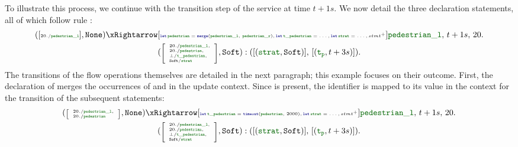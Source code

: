 To illustrate this process, we continue with the transition step of the  service at time
$t + 1s$. We now detail the three declaration statements, all of which follow rule
:
\begin{multline*}
    ([\mathtiny{20./\idf{pedestrian\_l}}], \No)
    \xRightarrow[\mathtiny{
            \decl{\idf{pedestrian}}{\mergeop{\idf{pedestrian\_l}}{\idf{pedestrian\_r}}},
            \decl{\idf{t\_pedestrian}}{\dots},
            \decl{\idf{strat}}{\dots},
            stmt^+
        }]{\idf{pedestrian\_l}, \, t+1s, \, 20.} \\
    (\mathtiny{\left[\begin{array}{l}
                20./\idf{pedestrian\_l},  \\
                20./\idf{pedestrian},     \\
                \bot/\idf{t\_pedestrian}, \\
                \Soft/\idf{strat}
            \end{array}\right]}, \Soft):
    ([(\idf{strat}, \Soft)], \, [(\idf{t_p}, t+3s)]).
\end{multline*}
%
The transitions of the flow operations themselves are detailed in the next paragraph; this example
focuses on their outcome.
%
First, the declaration of  merges the occurrences of  and
 in the update context. Since  is present, the identifier
 is mapped to its value in the context for the transition of the subsequent
statements:
\begin{multline*}
    (\mathtiny{\left[\begin{array}{l}
                20./\idf{pedestrian\_l}, \\
                20./\idf{pedestrian}
            \end{array}\right]}, \No)
    \xRightarrow[\mathtiny{
            \decl{\idf{t\_pedestrian}}{\timeout{\idf{pedestrian}}{2000}},
            \decl{\idf{strat}}{\dots},
            stmt^+
        }]{\idf{pedestrian\_l}, \, t+1s, \, 20.} \\
    (\mathtiny{\left[\begin{array}{l}
                20./\idf{pedestrian\_l},  \\
                20./\idf{pedestrian},     \\
                \bot/\idf{t\_pedestrian}, \\
                \Soft/\idf{strat}
            \end{array}\right]}, \Soft):
    ([(\idf{strat}, \Soft)], \, [(\idf{t_p}, t+3s)]).
\end{multline*}
